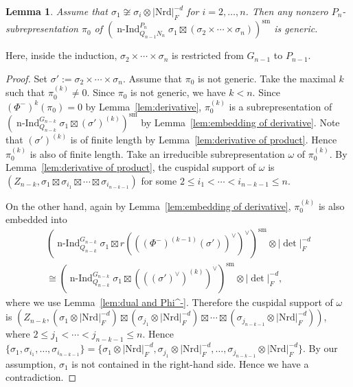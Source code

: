 \documentclass[a4paper]{amsart}
\numberwithin{equation}{section}
\newtheorem{lem}[thm]{Lemma}
\theoremstyle{remark}
\theoremstyle{definition}
\DeclareMathOperator{\nInd}{n-Ind}
\newcommand{\sm}{\mathrm{sm}}
\newcommand{\Nrd}{\mathrm{Nrd}}
\renewcommand{\simeq}{\cong}
\begin{document}
\begin{lem}\label{lem:genericity for GLnD, lemma}
Assume that $\sigma_{1}\not\simeq\sigma_{i}\otimes\lvert\Nrd\rvert^{-d}_{F}$ for $i = 2,\ldots,n$.
Then any nonzero $P_{n}$-subrepresentation $\pi_{0}$ of $(\nInd_{Q_{n - 1}N_{n}}^{P_{n}}\sigma_{1}\boxtimes(\sigma_{2}\times\cdots\times\sigma_{n}))^{\sm}$ is generic.
\end{lem}
Here, inside the induction, $\sigma_{2}\times\cdots\times\sigma_{n}$ is restricted from $G_{n-1}$ to $P_{n-1}$.
\begin{proof}
Set $\sigma' := \sigma_{2}\times\cdots\times\sigma_{n}$.
Assume that $\pi_{0}$ is not generic.
Take the maximal $k$ such that $\pi_{0}^{(k)}\ne 0$.
Since $\pi_{0}$ is not generic, we have $k < n$.
Since $(\Phi^{-})^{k}(\pi_{0}) = 0$ by Lemma~\ref{lem:derivative}, $\pi_{0}^{(k)}$ is a subrepresentation of $(\nInd_{Q_{n - k}}^{G_{n - k}}\sigma_{1}\boxtimes (\sigma')^{(k)})^{\sm}$ by Lemma~\ref{lem:embedding of derivative}.
Note that $(\sigma')^{(k)}$ is of finite length by Lemma~\ref{lem:derivative of product}.
Hence $\pi_{0}^{(k)}$ is also of finite length.
Take an irreducible subrepresentation $\omega$ of $\pi_0^{(k)}$.
By Lemma~\ref{lem:derivative of product}, the cuspidal support of $\omega$ is $(Z_{n-k},\sigma_{1}\boxtimes \sigma_{i_{1}}\boxtimes\cdots\boxtimes\sigma_{i_{n - k - 1}})$ for some $2\le i_{1} < \cdots < i_{n - k - 1}\le n$.

On the other hand, again by Lemma~\ref{lem:embedding of derivative}, $\pi_{0}^{(k)}$ is also embedded into 
\begin{multline*}
(\nInd_{Q_{n - k}}^{G_{n - k}}\sigma_{1}\boxtimes r(((\Phi^{-})^{(k - 1)}(\sigma'))^{\vee})^{\vee})^{\sm}\otimes \lvert\det\rvert_{F}^{-d}\\
\simeq
(\nInd_{Q_{n - k}}^{G_{n - k}}\sigma_{1}\boxtimes (((\sigma')^{\vee})^{(k)})^{\vee})^{\sm}\otimes \lvert\det\rvert_{F}^{-d},
\end{multline*}
where we use Lemma~\ref{lem:dual and Phi^-}.
Therefore the cuspidal support of $\omega$ is $(Z_{n-k},(\sigma_{1}\otimes\lvert\Nrd\rvert_{F}^{-d})\boxtimes(\sigma_{j_{1}}\otimes\lvert\Nrd\rvert_{F}^{-d})\boxtimes\cdots\boxtimes(\sigma_{j_{n - k - 1}}\otimes\lvert\Nrd\rvert_{F}^{-d}))$, where $2\le j_{1} < \cdots < j_{n - k - 1}\le n$.
Hence $\{\sigma_{1},\sigma_{i_{1}},\ldots,\sigma_{i_{n - k - 1}}\} = \{\sigma_{1}\otimes\lvert\Nrd\rvert_{F}^{-d},\sigma_{j_{1}}\otimes\lvert\Nrd\rvert_{F}^{-d},\ldots,\sigma_{j_{n - k - 1}}\otimes\lvert\Nrd\rvert_{F}^{-d}\}$.
By our assumption, $\sigma_{1}$ is not contained in the right-hand side.
Hence we have a contradiction.
\end{proof}
\end{document}

